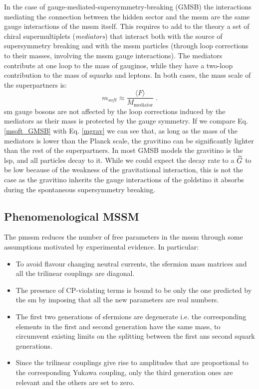 In the case of gauge-mediated-supersymmetry-breaking (GMSB) \cite{Dine:1981gu, AlvarezGaume:1981wy, Nappi:1982hm, PhysRevD.48.1277, Dine:1994vc, Dine:1995ag} the interactions mediating the connection between the hidden sector and the \gls{mssm} are the same gauge interactions of the \gls{mssm} itself. This requires to add to the theory a set of chiral supermultiplets (\textit{mediators}) that interact both with the source of supersymmetry breaking and with the \gls{mssm} particles (through loop corrections to their masses, involving the \gls{mssm} gauge interactions). The mediators contribute at one loop to the mass of gauginos, while they have a two-loop contribution to the mass of squarks and leptons. In both cases, the mass scale of the superpartners is:
\begin{equation}
m_{soft} \approx \frac{\langle F \rangle}{M_\mathrm{mediator}} \; .
\label{msoft_GMSB}
\end{equation}
\gls{sm} gauge bosons are not affected by the loop corrections induced by the mediators as their mass is protected by the gauge symmetry.
If we compare Eq. \ref{msoft_GMSB} with Eq. \ref{mgrav} we can see that, as long as the mass of the mediators is lower than the Planck scale, the gravitino can be significantly lighter than the rest of the superpartners. In most GMSB models the gravitino is the \gls{lsp}, and all particles decay to it. While we could expect the decay rate to a $\widetilde{G}$ to be low because of the weakness of the gravitational interaction, this is not the case as the gravitino inherits the gauge interactions of the goldstino it absorbs during the spontaneous supersymmetry breaking.  


\subsection{Phenomenological MSSM}
\label{sec:theory:pmssm}

The \gls{pmssm} \cite{Djouadi:1998di} reduces the number of free parameters in the \gls{mssm} through some assumptions motivated by experimental evidence. In particular:
\begin{itemize}
\item To avoid flavour changing neutral currents, the sfermion mass matrices and all the trilinear couplings are diagonal. 
\item The presence of CP-violating terms is bound to be only the one predicted by the \gls{sm} by imposing that all the new parameters are real numbers.
\item The first two generations of sfermions are degenerate i.e. the corresponding elements in the first and second generation have the same mass, to circumvent existing limits on the splitting between the first ans second squark generations.
\item Since the trilinear couplings give rise to amplitudes that are proportional to the corresponding Yukawa coupling, only the third generation ones are relevant and the others are set to zero.
\end{itemize}

